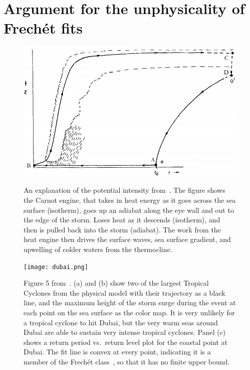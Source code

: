 \documentclass[usenames, dvipsnames]{article}      %
\begin{document}
\section{Argument for the unphysicality of Frech\'et fits}
\label{sec:frechet}

\begin{figure}
    \centering
    \includegraphics[width=0.45\linewidth]{hurricane-carnot.png}
    \caption{An explanation of the potential intensity
            from~\cite{emanuel1987dependence}.
            The figure shows the Carnot engine, that takes
            in heat energy as it goes across the sea surface (isotherm),
            goes up an adiabat along the eye wall and 
            out to the edge of the storm.
            Loses heat as it descends (isotherm), and
            then is pulled back into the storm (adiabat).
            The work from the heat engine then drives the surface
            waves, sea surface gradient, and upwelling of colder
            waters from the thermocline.
    }
    \label{fig:carnot}
    \texttt{[image: dubai.png]}
    \caption{Figure 5 from~\cite{Lin2015GreyCyclones}.
            (a) and (b) show two of the largest Tropical Cyclones 
            from the physical model with their trajectory
            as a black line, and the maximum height of the 
            storm surge during the event at each point
            on the sea surface as the color map.
            It is very unlikely for a tropical cyclone to hit Dubai,
            but the very warm seas around Dubai are able 
            to sustain very intense tropical cyclones.
            Panel (c) shows a return period vs.~return 
            level plot for the coastal point at Dubai.
            The fit line is convex at every point, 
            indicating it is a member of the Frech\'et class~\cite{coles2001introduction}, so that 
            it has no finite upper bound.
            }
    \label{fig:DUBAI-FRECHET}

\end{figure}
\end{document}
